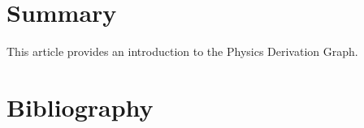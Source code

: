 \documentclass{article}
\newcommand{\pdg}{Physics Derivation Graph}
\begin{document}
\begin{multicols}{2}
\section{Summary\label{sec:summary}}
This article provides an introduction to the \pdg. 

\section{Bibliography}


\end{multicols}

\newpage
\appendix
%
\end{document}
